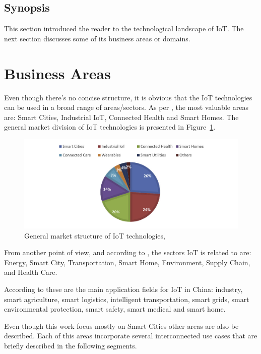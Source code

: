 \subsection{Synopsis}
\label{subsec:stateofart:synopsis}

This section introduced the reader to the technological landscape of \gls{IoT}. The next section discusses some of its business areas or domains.

\section{Business Areas}
\label{sec:stateofart:areas}

Even though there's no concise structure, it is obvious that the \gls{IoT} technologies can be used in a broad range of areas/sectors. As per \cite{nivzetic2019smart}, the most valuable areas are: Smart Cities, Industrial \gls{IoT}, Connected Health and Smart Homes. The general market division of IoT technologies is presented in Figure~\ref{fig:iot-areas}.

\begin{figure}[H]
    \centering
    \includegraphics[scale=0.5]{
        assets/figures/iot-areas.png
    }
    \caption[IoT market structure]{General market structure of IoT technologies, \cite{nivzetic2019smart}}
    \label{fig:iot-areas}
\end{figure}

From another point of view, and according to \cite{7073822}, the sectors \gls{IoT} is related to are: Energy, Smart City, Transportation, Smart Home, Environment, Supply Chain, and Health Care.

According to \cite{6851114} these are the main application fields for \gls{IoT} in China: industry, smart agriculture, smart logistics, intelligent transportation, smart grids, smart environmental protection, smart safety, smart medical and smart home.

Even though this work focus mostly on Smart Cities other areas are also be described. Each of this areas incorporate several interconnected use cases that are briefly described in the following segments.


